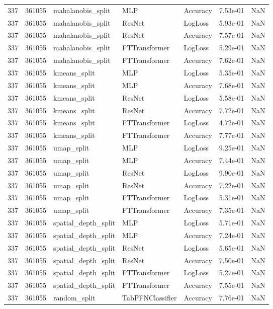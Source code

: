 \begin{tabular}{rrlllrr}
337 & 361055 & mahalanobis\_split & MLP & Accuracy & 7.53e-01 & NaN \\
337 & 361055 & mahalanobis\_split & ResNet & LogLoss & 5.93e-01 & NaN \\
337 & 361055 & mahalanobis\_split & ResNet & Accuracy & 7.57e-01 & NaN \\
337 & 361055 & mahalanobis\_split & FTTransformer & LogLoss & 5.29e-01 & NaN \\
337 & 361055 & mahalanobis\_split & FTTransformer & Accuracy & 7.62e-01 & NaN \\
337 & 361055 & kmeans\_split & MLP & LogLoss & 5.35e-01 & NaN \\
337 & 361055 & kmeans\_split & MLP & Accuracy & 7.68e-01 & NaN \\
337 & 361055 & kmeans\_split & ResNet & LogLoss & 5.58e-01 & NaN \\
337 & 361055 & kmeans\_split & ResNet & Accuracy & 7.72e-01 & NaN \\
337 & 361055 & kmeans\_split & FTTransformer & LogLoss & 4.72e-01 & NaN \\
337 & 361055 & kmeans\_split & FTTransformer & Accuracy & 7.77e-01 & NaN \\
337 & 361055 & umap\_split & MLP & LogLoss & 9.25e-01 & NaN \\
337 & 361055 & umap\_split & MLP & Accuracy & 7.44e-01 & NaN \\
337 & 361055 & umap\_split & ResNet & LogLoss & 9.90e-01 & NaN \\
337 & 361055 & umap\_split & ResNet & Accuracy & 7.22e-01 & NaN \\
337 & 361055 & umap\_split & FTTransformer & LogLoss & 5.31e-01 & NaN \\
337 & 361055 & umap\_split & FTTransformer & Accuracy & 7.35e-01 & NaN \\
337 & 361055 & spatial\_depth\_split & MLP & LogLoss & 5.71e-01 & NaN \\
337 & 361055 & spatial\_depth\_split & MLP & Accuracy & 7.24e-01 & NaN \\
337 & 361055 & spatial\_depth\_split & ResNet & LogLoss & 5.65e-01 & NaN \\
337 & 361055 & spatial\_depth\_split & ResNet & Accuracy & 7.50e-01 & NaN \\
337 & 361055 & spatial\_depth\_split & FTTransformer & LogLoss & 5.27e-01 & NaN \\
337 & 361055 & spatial\_depth\_split & FTTransformer & Accuracy & 7.55e-01 & NaN \\
337 & 361055 & random\_split & TabPFNClassifier & Accuracy & 7.76e-01 & NaN \\

\end{tabular}
